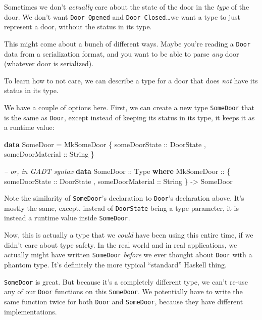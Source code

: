 \documentclass[]{article}
\newenvironment{Shaded}{}{}
\newcommand{\CommentTok}[1]{\textcolor[rgb]{0.38,0.63,0.69}{\textit{#1}}}
\newcommand{\DataTypeTok}[1]{\textcolor[rgb]{0.56,0.13,0.00}{#1}}
\newcommand{\KeywordTok}[1]{\textcolor[rgb]{0.00,0.44,0.13}{\textbf{#1}}}
\newcommand{\NormalTok}[1]{#1}
\newcommand{\OtherTok}[1]{\textcolor[rgb]{0.00,0.44,0.13}{#1}}
\begin{document}
Sometimes we don't \emph{actually} care about the state of the door in the
\emph{type} of the door. We don't want \texttt{Door\ \textquotesingle{}Opened}
and \texttt{Door\ \textquotesingle{}Closed}\ldots we want a type to just
represent a door, without the status in its type.

This might come about a bunch of different ways. Maybe you're reading a
\texttt{Door} data from a serialization format, and you want to be able to parse
\emph{any} door (whatever door is serialized).

To learn how to not care, we can describe a type for a door that does \emph{not}
have its status in its type.

We have a couple of options here. First, we can create a new type
\texttt{SomeDoor} that is the same as \texttt{Door}, except instead of keeping
its status in its type, it keeps it as a runtime value:

\begin{Shaded}
\begin{Highlighting}[]
\KeywordTok{data} \DataTypeTok{SomeDoor} \OtherTok{=} \DataTypeTok{MkSomeDoor}
\NormalTok{    \{}\OtherTok{ someDoorState    ::} \DataTypeTok{DoorState}
\NormalTok{    ,}\OtherTok{ someDoorMaterial ::} \DataTypeTok{String}
\NormalTok{    \}}

\CommentTok{-- or, in GADT syntax}
\KeywordTok{data} \DataTypeTok{SomeDoor}\OtherTok{ ::} \DataTypeTok{Type} \KeywordTok{where}
    \DataTypeTok{MkSomeDoor} \OtherTok{::}
\NormalTok{      \{}\OtherTok{ someDoorState    ::} \DataTypeTok{DoorState}
\NormalTok{      ,}\OtherTok{ someDoorMaterial ::} \DataTypeTok{String}
\NormalTok{      \} }\OtherTok{->} \DataTypeTok{SomeDoor}
\end{Highlighting}
\end{Shaded}

Note the similarity of \texttt{SomeDoor}'s declaration to \texttt{Door}'s
declaration above. It's mostly the same, except, instead of \texttt{DoorState}
being a type parameter, it is instead a runtime value inside \texttt{SomeDoor}.

Now, this is actually a type that we \emph{could} have been using this entire
time, if we didn't care about type safety. In the real world and in real
applications, we actually might have written \texttt{SomeDoor} \emph{before} we
ever thought about \texttt{Door} with a phantom type. It's definitely the more
typical ``standard'' Haskell thing.

\texttt{SomeDoor} is great. But because it's a completely different type, we
can't re-use any of our \texttt{Door} functions on this \texttt{SomeDoor}. We
potentially have to write the same function twice for both \texttt{Door} and
\texttt{SomeDoor}, because they have different implementations.
\end{document}
